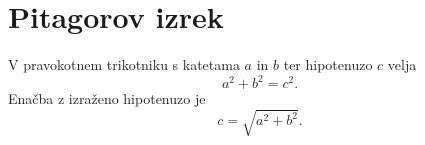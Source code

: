 \documentclass{article}
\begin{document}
\section*{Pitagorov izrek}
V pravokotnem trikotniku s katetama \(a\) in \(b\) ter hipotenuzo \(c\) velja
\[ a^2 + b^2 = c^2. \]
Enačba z izraženo hipotenuzo je
\[ c = \sqrt{ a^2 + b^2}.\]
\end{document}
